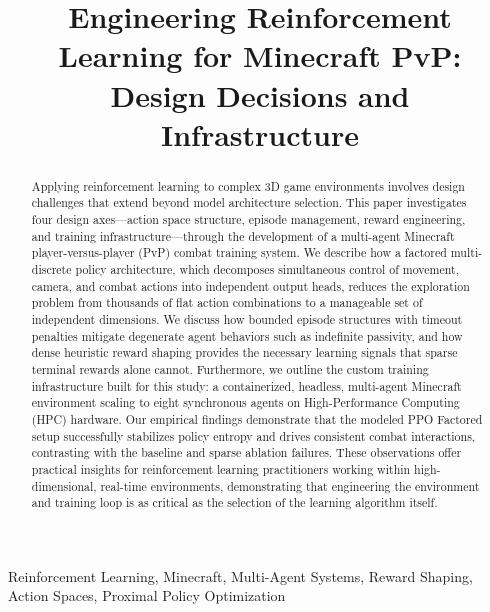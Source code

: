 \documentclass[conference]{IEEEtran}
\begin{document}
\title{Engineering Reinforcement Learning for Minecraft PvP: Design Decisions and Infrastructure}

\author{}

\maketitle

\begin{abstract}
Applying reinforcement learning to complex 3D game environments involves design challenges that extend beyond model architecture selection. This paper investigates four design axes---action space structure, episode management, reward engineering, and training infrastructure---through the development of a multi-agent Minecraft player-versus-player (PvP) combat training system. We describe how a factored multi-discrete policy architecture, which decomposes simultaneous control of movement, camera, and combat actions into independent output heads, reduces the exploration problem from thousands of flat action combinations to a manageable set of independent dimensions. We discuss how bounded episode structures with timeout penalties mitigate degenerate agent behaviors such as indefinite passivity, and how dense heuristic reward shaping provides the necessary learning signals that sparse terminal rewards alone cannot. Furthermore, we outline the custom training infrastructure built for this study: a containerized, headless, multi-agent Minecraft environment scaling to eight synchronous agents on High-Performance Computing (HPC) hardware. Our empirical findings demonstrate that the modeled PPO Factored setup successfully stabilizes policy entropy and drives consistent combat interactions, contrasting with the baseline and sparse ablation failures. These observations offer practical insights for reinforcement learning practitioners working within high-dimensional, real-time environments, demonstrating that engineering the environment and training loop is as critical as the selection of the learning algorithm itself.
\end{abstract}

\begin{IEEEkeywords}
Reinforcement Learning, Minecraft, Multi-Agent Systems, Reward Shaping, Action Spaces, Proximal Policy Optimization
\end{IEEEkeywords}
\end{document}
